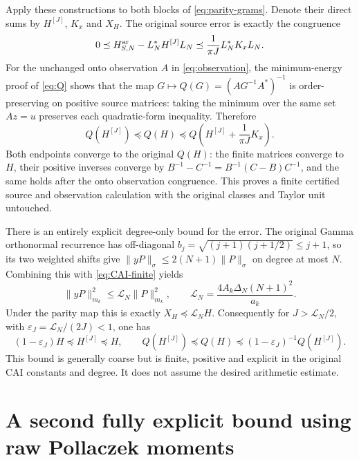 \documentclass[11pt]{article}
\begin{document}
Apply these constructions to both blocks of
\eqref{eq:parity-grams}. Denote their direct sums by $H^{[J]}$,
$K_x$ and $X_H$. The original source error is exactly the
congruence
\[
 0\preceq H_{S,N}^{\rm ar}-L_N^*H^{[J]}L_N
       \preceq\frac1{\pi J}L_N^*K_xL_N.
\]
For the unchanged onto observation $A$ in \eqref{eq:observation},
the minimum-energy proof of \eqref{eq:Q} shows that the map
$G\mapsto Q(G)=(AG^{-1}A^*)^{-1}$ is order-preserving on positive
source matrices: taking the minimum over the same set $Az=u$
preserves each quadratic-form inequality. Therefore
\begin{equation}\label{eq:Q-bracket}
 \boxed{Q(H^{[J]})\preceq Q(H)\preceq
 Q\left(H^{[J]}+\frac1{\pi J}K_x\right).}
\end{equation}
Both endpoints converge to the original $Q(H)$: the finite
matrices converge to $H$, their positive inverses converge by
$B^{-1}-C^{-1}=B^{-1}(C-B)C^{-1}$, and the same holds after
the onto observation congruence. This proves a finite certified
source and observation calculation with the original classes and
Taylor unit untouched.

There is an entirely explicit degree-only bound for the error.
The original Gamma orthonormal recurrence has off-diagonal
$b_j=\sqrt{(j+1)(j+1/2)}\leq j+1$, so its two weighted shifts
give $\|yP\|_\sigma\leq2(N+1)\|P\|_\sigma$ on degree at most $N$.
Combining this with \eqref{eq:CAI-finite} yields
\begin{equation}\label{eq:L-bound}
 \|yP\|_{m_k}^2\leq\mathcal L_N\|P\|_{m_k}^2,
 \qquad \mathcal L_N=
       \frac{4A_k\Delta_N(N+1)^2}{a_k}.
\end{equation}
Under the parity map this is exactly $X_H\preceq\mathcal L_NH$.
Consequently for $J>\mathcal L_N/2$, with
$\varepsilon_J=\mathcal L_N/(2J)<1$, one has
\begin{equation}\label{eq:relative}
 (1-\varepsilon_J)H\preceq H^{[J]}\preceq H,
 \qquad
 Q(H^{[J]})\preceq Q(H)
       \preceq(1-\varepsilon_J)^{-1}Q(H^{[J]}).
\end{equation}
This bound is generally coarse but is finite, positive and
explicit in the original CAI constants and degree. It does not
assume the desired arithmetic estimate.

\section{A second fully explicit bound using raw Pollaczek moments}
\end{document}

